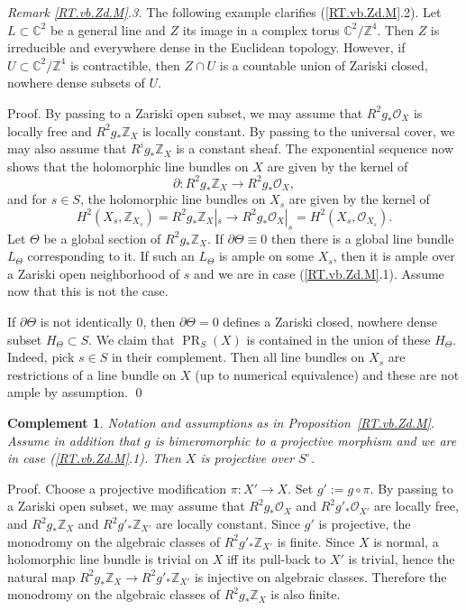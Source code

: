 \documentclass{amsart}
\newtheorem{complem}[thm]{Complement}%
\theoremstyle{definition}
\theoremstyle{remark}
\renewcommand{\c}[0]{{\mathbb C}}
\renewcommand{\o}[0]{{\mathcal O}}
\newcommand{\z}[0]{{\mathbb Z}}
\begin{document}
  {\it Remark \ref{RT.vb.Zd.M}.3.}   The following example clarifies  (\ref{RT.vb.Zd.M}.2).
  Let $L\subset \c^2$ be a general line and $Z$ its image in a complex torus
  $\c^2/\z^4$. Then $Z$ is irreducible and everywhere dense in the Euclidean topology. However, if $U\subset \c^2/\z^4$ is contractible, then
  $Z\cap U$ is a countable union of  Zariski closed, nowhere dense subsets of $U$.
  \medskip

  Proof. By passing to a Zariski open subset,  we may assume that 
  $R^2g_*\o_X$ is locally free and  $R^2g_*\z_X$ is  locally constant.
  By passing to the universal cover, we  may also assume that 
  $R^ig_*\z_X$ is a  constant sheaf.  The exponential sequence now shows that the holomorphic line bundles on $X$ are given by the kernel of
  $$\partial: R^2g_*\z_X\to R^2g_*\o_X,$$ and for $s\in S$,  the holomorphic line bundles on $X_s$ are given by the kernel of
  $$
  H^2(X_s, \z_{X_s})=R^2g_*\z_X|_s\to R^2g_*\o_X|_s= H^2(X_s, \o_{X_s}).
  $$
  Let $\Theta$  be a global section of $R^2g_*\z_X$. If $\partial\Theta\equiv 0$
  then there is a global line bundle $L_\Theta$ corresponding to it.
  If such an $L_\Theta$ is ample on some $X_s$, then it is ample over a
   Zariski open neighborhood of $s$ and we are in case (\ref{RT.vb.Zd.M}.1).  Assume now that this is not the case.

  
   If  $\partial\Theta$ is not identically $0$, then   $\partial\Theta=0$ defines a Zariski closed, nowhere dense subset $H_\Theta\subset S$.
   We claim that $\operatorname{PR}_{S}(X)$ is contained in the union of these 
  $H_\Theta$.  Indeed, pick  $s\in S$ in their complement.  Then all line bundles on $X_s$ are restrictions of a line bundle on $X$ (up to numerical equivalence) and these are not ample by assumption. \qed
  

\begin{complem} \label{RT.vb.Zd.M.c} Notation and assumptions as in Proposition~\ref{RT.vb.Zd.M}. Assume in addition that  $g$ is bimeromorphic to a projective morphism and we are in case (\ref{RT.vb.Zd.M}.1). Then $X$ is projective over $S^\circ$. 
\end{complem}

Proof. Choose a projective modification $\pi:X'\to X$. Set $g':=g\circ \pi$. By passing to a 
 Zariski open subset, we may assume  that 
 $R^2g_*\o_X$ and  $R^2g'_*\o_{X'}$ are  locally free, and  $R^2g_*\z_X$  and $R^2g'_*\z_{X'}$ are  locally constant.  Since $g'$ is projective, the monodromy on the algebraic classes of $R^2g'_*\z_{X'}$ is finite.
Since $X$ is normal, a
 holomorphic line bundle is trivial on $X$ iff its pull-back to $X'$ is trivial,
hence the natural map  $R^2g_*\z_X\to R^2g'_*\z_{X'}$ is injective  on  algebraic classes. Therefore 
   the monodromy on the algebraic classes of $R^2g_*\z_{X}$ is also finite.
\end{document}
